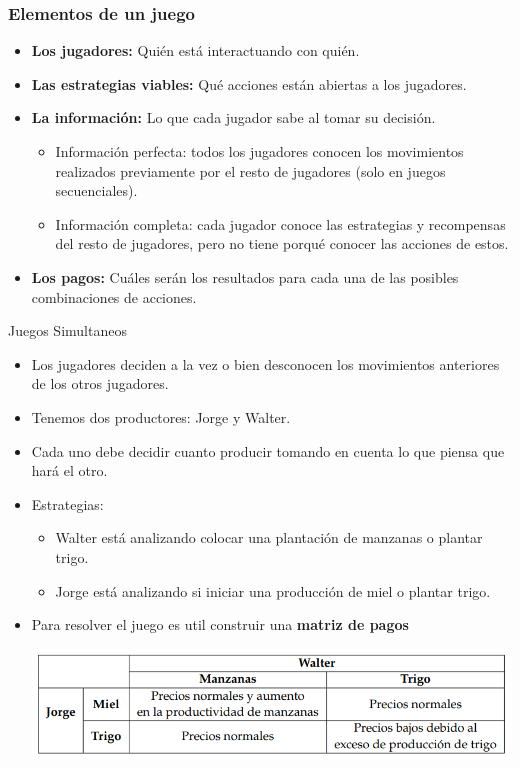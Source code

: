 \documentclass{beamer}
\begin{document}
\begin{frame}
    \frametitle{Elementos de un juego}
    \begin{itemize}
        \item \textbf{Los jugadores:} Quién está interactuando con quién.
        \item \textbf{Las estrategias viables:} Qué acciones están abiertas a los jugadores.
        \item \textbf{La información:} Lo que cada jugador sabe al tomar su decisión.
        \begin{itemize}
            \item Información perfecta: todos los jugadores conocen los movimientos realizados previamente por el resto de jugadores (solo en juegos secuenciales).
            \item Información completa: cada jugador conoce las estrategias y recompensas del resto de jugadores, pero no tiene porqué conocer las acciones de estos.
        \end{itemize}
        \item \textbf{Los pagos:} Cuáles serán los resultados para cada una de las posibles combinaciones de acciones.\vspace{4mm}
    \end{itemize}
\end{frame}

\begin{frame}{Juegos Simultaneos}
    \begin{itemize}
        \item Los jugadores deciden a la vez o bien desconocen los movimientos anteriores de los otros jugadores.
        \item Tenemos dos productores: Jorge y Walter.
        \item Cada uno debe decidir cuanto producir tomando en cuenta lo que piensa que hará el otro.
        \item Estrategias:
        \begin{itemize}
            \item Walter está analizando colocar una plantación de manzanas o plantar trigo.
            \item Jorge está analizando si iniciar una producción de miel o plantar trigo.
        \end{itemize}
        \item Para resolver el juego es util construir una \textbf{matriz de pagos}

        \centering
        \includegraphics[scale=0.6]{../Figures/T20.1.png}

    \end{itemize}
\end{frame}
\end{document}
